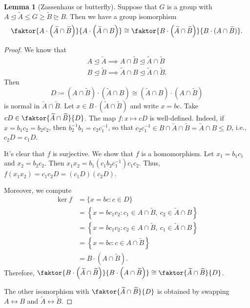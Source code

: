 \documentclass[10pt,letterpaper,cm]{nupset}
\theoremstyle{definition}
\theoremstyle{theorem}
\newtheorem{lemma}[definition]{Lemma}
\theoremstyle{remark}
\newcommand{\1}{\mathbf{1}}
\newcommand{\0}{\vec 0}
\begin{document}
\begin{lemma}[Zassenhaus or butterfly]
Suppose that $G$ is a group with $A \unlhd \widetilde{A} \leq G \geq \widetilde{B} \unrhd B$. Then we have a group isomorphism $$\faktor{A\cdot \left(\widetilde{A} \cap \widetilde{B}\right)}{A \cdot \left(\widetilde{A} \cap B\right)} \cong \faktor{B \cdot \left(\widetilde{A} \cap \widetilde{B}\right)}{B\cdot (A \cap \widetilde{B})}.$$
\end{lemma}
\begin{proof}
We know that \begin{gather*}
A \unlhd \widetilde{A} \implies A \cap \widetilde{B} \unlhd \widetilde{A} \cap \widetilde{B} 
\\ B \unlhd \widetilde{B} \implies \widetilde{A} \cap B \unlhd \widetilde{A} \cap \widetilde{B}.
\end{gather*} 
Then $$D\coloneqq  \left({A} \cap \widetilde{B}\right) \cdot \left(\widetilde{A} \cap {B}\right) \cong  \left(\widetilde{A} \cap {B}\right) \cdot \left({A} \cap \widetilde{B}\right)$$ is normal in $\widetilde{A} \cap \widetilde{B}$. Let $x \in B \cdot \left(\widetilde{A} \cap \widetilde{B}\right)$ and write $x = bc$. Take $cD \in \faktor{\widetilde{A} \cap \widetilde{B}}{D}$. The map $f: x \mapsto cD$ is well-defined. Indeed, if $x = b_1c_2 = b_2c_2$, then $b_2^{-1}b_1 = c_2c_1^{-1}$, so that $c_2c_1^{-1} \in B \cap \widetilde{A} \cap \widetilde{B} = \widetilde{A}\cap B \leq D$, i.e., $c_2D = c_1D$.

\medskip

It's clear that $f$ is surjective. We show that $f$ is a homomorphism. Let $x_1= b_1c_1$ and $x_2 = b_2c_2$. Then $x_1x_2 = b_1(c_1b_2c_1^{-1})c_1c_2$. Thus, $f(x_1x_2) = c_1c_2D = (c_1D)(c_2D)$.

\medskip


Moreover, we compute 
\begin{align*} 
\ker{f} &= \{x = bc : c \in D\}  
\\ & = \left\{ x= bc_1c_2 : c_1\in {A} \cap \widetilde{B}, \  c_2 \in \widetilde{A} \cap {B}\right\}
\\ & = \left\{ x= bc_1c_2 : c_2\in {A} \cap \widetilde{B}, \  c_1 \in \widetilde{A} \cap {B}\right\} 
\\ & = \left\{x = bc : c \in A \cap \widetilde{B}\right\} 
\\  & = B \cdot \left(A \cap \widetilde{B}\right).
\end{align*} Therefore, $\faktor{B \cdot \left(\widetilde{A} \cap \widetilde{B}\right)}{ B \cdot \left(A \cap \widetilde{B}\right)} \cong \faktor{\widetilde{A} \cap \widetilde{B}}{D}$. 

\medskip

 The other isomorphism with $\faktor{\widetilde{A} \cap \widetilde{B}}{D}$ is obtained by swapping $A \longleftrightarrow B$ and $\widetilde{A} \longleftrightarrow \widetilde{B}$.
\end{proof}
\end{document}
